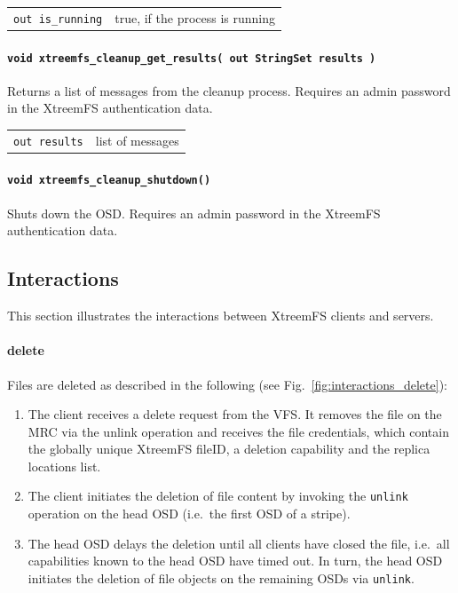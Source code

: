 \begin{tabularx}{\textwidth}{lX}
 \texttt{out is\_running} & true, if the process is running
\end{tabularx}


\paragraph{\texttt{void xtreemfs\_cleanup\_get\_results( out StringSet results~)}}
Returns a list of messages from the cleanup process. Requires an admin password in the XtreemFS authentication data.

\begin{tabularx}{\textwidth}{lX}
 \texttt{out results} & list of messages
\end{tabularx}


\paragraph{\texttt{void xtreemfs\_cleanup\_shutdown()}}
Shuts down the OSD. Requires an admin password in the XtreemFS authentication data.


\subsection{Interactions}

This section illustrates the interactions between XtreemFS clients and servers.

\paragraph{delete}

Files are deleted as described in the following (see Fig.\ \ref{fig:interactions_delete}):

\begin{enumerate}
 \item The client receives a delete request from the VFS. It removes the file on the MRC via the unlink operation and receives the file credentials, which contain the globally unique XtreemFS fileID, a deletion capability and the replica locations list.
 \item The client initiates the deletion of file content by invoking the \texttt{unlink} operation on the head OSD (i.e.\ the first OSD of a stripe).
 \item The head OSD delays the deletion until all clients have closed the file, i.e.\ all capabilities known to the head OSD have timed out. In turn, the head OSD initiates the deletion of file objects on the remaining OSDs via \texttt{unlink}.
\end{enumerate}


